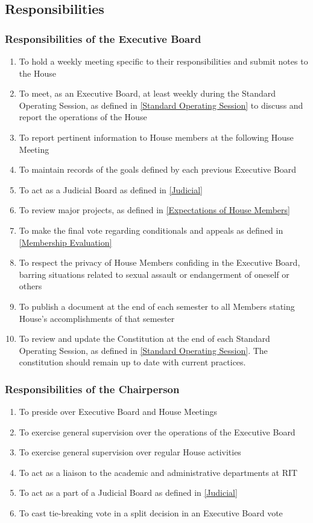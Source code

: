 \documentclass{article}
\newcommand{\asection}[1]{\subsection{#1} \label{#1}}
\newcommand{\asubsection}[1]{\subsubsection{#1} \label{#1}}
\begin{document}
\asection{Responsibilities}
\renewcommand{\theenumi}{\alph{enumi}} %
\asubsection{Responsibilities of the Executive Board}
\begin{enumerate}
	\item To hold a weekly meeting specific to their responsibilities and submit notes to the House
	\item To meet, as an Executive Board, at least weekly during the Standard Operating Session, as defined in \ref{Standard Operating Session} to discuss and report the operations of the House
	\item To report pertinent information to House members at the following House Meeting
	\item To maintain records of the goals defined by each previous Executive Board
	\item To act as a Judicial Board as defined in \ref{Judicial}
	\item To review major projects, as defined in \ref{Expectations of House Members}
	\item To make the final vote regarding conditionals and appeals as defined in \ref{Membership Evaluation}
	\item To respect the privacy of House Members confiding in the Executive Board, barring situations related to sexual assault or endangerment of oneself or others
	\item To publish a document at the end of each semester to all Members stating House’s accomplishments of that semester
	\item To review and update the Constitution at the end of each Standard Operating Session, as defined in \ref{Standard Operating Session}.
		The constitution should remain up to date with current practices.
\end{enumerate}

\asubsection{Responsibilities of the Chairperson}
\begin{enumerate}
	\item To preside over Executive Board and House Meetings
	\item To exercise general supervision over the operations of the Executive Board
	\item To exercise general supervision over regular House activities
	\item To act as a liaison to the academic and administrative departments at RIT
	\item To act as a part of a Judicial Board as defined in \ref{Judicial}
	\item To cast tie-breaking vote in a split decision in an Executive Board vote
\end{enumerate}
\end{document}
